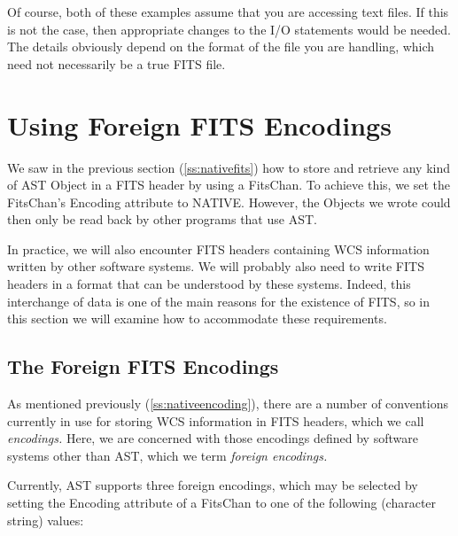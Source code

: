 \documentclass[twoside,11pt]{article}
\newcommand{\htmlref}[2]{#1}
\newcommand{\secref}[1]{\S\ref{#1}}
\renewcommand{\secref}[1]{\ref{#1}}
\begin{document}
Of course, both of these examples assume that you are accessing text
files. If this is not the case, then appropriate changes to the I/O
statements would be needed.  The details obviously depend on the
format of the file you are handling, which need not necessarily be a
true FITS file.

\cleardoublepage
\section{\label{ss:foreignfits}Using Foreign FITS Encodings}

We saw in the previous section (\secref{ss:nativefits}) how to store
and retrieve any kind of AST \htmlref{Object}{Object} in a FITS header by using a
\htmlref{FitsChan}{FitsChan}. To achieve this, we set the FitsChan's \htmlref{Encoding}{Encoding} attribute to
NATIVE. However, the Objects we wrote could then only be read back by
other programs that use AST.

In practice, we will also encounter FITS headers containing WCS
information written by other software systems.  We will probably also
need to write FITS headers in a format that can be understood by these
systems. Indeed, this interchange of data is one of the main reasons
for the existence of FITS, so in this section we will examine how to
accommodate these requirements.

\subsection{\label{ss:foreignencodings}The Foreign FITS Encodings}

As mentioned previously (\secref{ss:nativeencoding}), there are a
number of conventions currently in use for storing WCS information in
FITS headers, which we call {\em{encodings.}} Here, we are concerned
with those encodings defined by software systems other than AST, which
we term {\em{foreign encodings.}}

Currently, AST supports three foreign encodings, which may be selected
by setting the \htmlref{Encoding}{Encoding} attribute of a \htmlref{FitsChan}{FitsChan} to one of the
following (character string) values:
\end{document}
